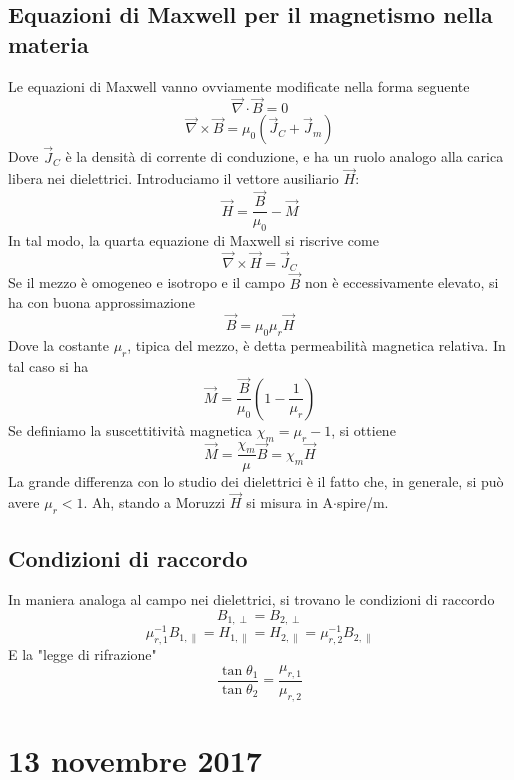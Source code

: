 \documentclass[a4paper,11pt]{book}
\let\oldnabla\nabla
\renewcommand{\nabla}{\vec{\oldnabla}}
\theoremstyle{definition}
\theoremstyle{theorem}
\begin{document}
\subsection{Equazioni di Maxwell per il magnetismo nella materia}
Le equazioni di Maxwell vanno ovviamente modificate nella forma seguente
\[\nabla\cdot\vec{B}=0\]
\[\nabla\times\vec{B}=\mu_0(\vec{J}_C+\vec{J}_m)\]
Dove $\vec{J}_C$ è la densità di corrente di conduzione, e ha un ruolo analogo alla carica libera nei dielettrici. Introduciamo il vettore ausiliario $\vec{H}$:
\[\vec{H}=\frac{\vec{B}}{\mu_0}-\vec{M}\]
In tal modo, la quarta equazione di Maxwell si riscrive come
\[\nabla\times\vec{H}=\vec{J}_C\]
Se il mezzo è omogeneo e isotropo e il campo $\vec{B}$ non è eccessivamente elevato, si ha con buona approssimazione
\[\vec{B}=\mu_0\mu_r\vec{H}\]
Dove la costante $\mu_r$, tipica del mezzo, è detta permeabilità magnetica relativa. In tal caso si ha \[\vec{M}=\frac{\vec{B}}{\mu_0}\left(1-\frac{1}{\mu_r}\right)\]
Se definiamo la suscettitività magnetica $\chi_m=\mu_r-1$, si ottiene
\[\vec{M}=\frac{\chi_m}{\mu}\vec{B}=\chi_m\vec{H}\]
La grande differenza con lo studio dei dielettrici è il fatto che, in generale, si può avere $\mu_r<1$. Ah, stando a Moruzzi $\vec H$ si misura in A$\cdot$spire/m.
\subsection{Condizioni di raccordo}
In maniera analoga al campo nei dielettrici, si trovano le condizioni di raccordo
\[B_{1,\perp}=B_{2,\perp}\]
\[\mu_{r,1}^{-1}B_{1,\parallel}=H_{1,\parallel}=H_{2,\parallel}=\mu_{r,2}^{-1}B_{2,\parallel}\]
E la "legge di rifrazione"
\[\frac{\tan\theta_1}{\tan\theta_2}=\frac{\mu_{r,1}}{\mu_{r,2}}\]
\section{13 novembre 2017}
\end{document}
